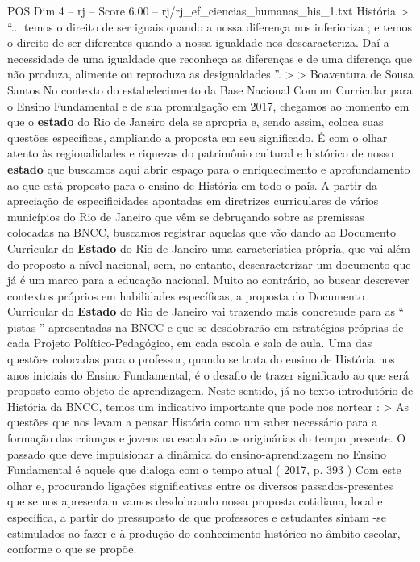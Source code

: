 \begin{textsample}{POS Dim 4 – rj – Score 6.00 – rj/rj\_ef\_ciencias\_humanas\_his\_1.txt}  \label{ex:f4_pos_167}
História > “... temos o direito de ser iguais quando a nossa diferença nos inferioriza ; e temos o direito de ser diferentes quando a nossa igualdade nos descaracteriza.
Daí a necessidade de uma igualdade que reconheça as diferenças e de uma diferença que não produza, alimente ou reproduza as desigualdades ”. > > Boaventura de Sousa Santos No contexto do estabelecimento da Base Nacional Comum Curricular para o Ensino Fundamental e de sua promulgação em 2017, chegamos ao momento em que o \textbf{estado} do Rio de Janeiro dela se apropria e, sendo assim, coloca suas questões específicas, ampliando a proposta em seu significado.
É com o olhar atento às regionalidades e riquezas do patrimônio cultural e histórico de nosso \textbf{estado} que buscamos aqui abrir espaço para o enriquecimento e aprofundamento ao que está proposto para o ensino de História em todo o país.
A partir da apreciação de especificidades apontadas em diretrizes curriculares de vários municípios do Rio de Janeiro que vêm se debruçando sobre as premissas colocadas na BNCC, buscamos registrar aquelas que vão dando ao Documento Curricular do \textbf{Estado} do Rio de Janeiro uma característica própria, que vai além do proposto a nível nacional, sem, no entanto, descaracterizar um documento que já é um marco para a educação nacional.
Muito ao contrário, ao buscar descrever contextos próprios em habilidades específicas, a proposta do Documento Curricular do \textbf{Estado} do Rio de Janeiro vai trazendo mais concretude para as “ pistas ” apresentadas na BNCC e que se desdobrarão em estratégias próprias de cada Projeto Político-Pedagógico, em cada escola e sala de aula.
Uma das questões colocadas para o professor, quando se trata do ensino de História nos anos iniciais do Ensino Fundamental, é o desafio de trazer significado ao que será proposto como objeto de aprendizagem.
Neste sentido, já no texto introdutório de História da BNCC, temos um indicativo importante que pode nos nortear : > As questões que nos levam a pensar História como um saber necessário para a formação das crianças e jovens na escola são as originárias do tempo presente.
O passado que deve impulsionar a dinâmica do ensino-aprendizagem no Ensino Fundamental é aquele que dialoga com o tempo atual ( 2017, p. 393 ) Com este olhar e, procurando ligações significativas entre os diversos passados-presentes que se nos apresentam vamos desdobrando nossa proposta cotidiana, local e específica, a partir do pressuposto de que professores e estudantes sintam -se estimulados ao fazer e à produção do conhecimento histórico no âmbito escolar, conforme o que se propõe.

\end{textsample}
